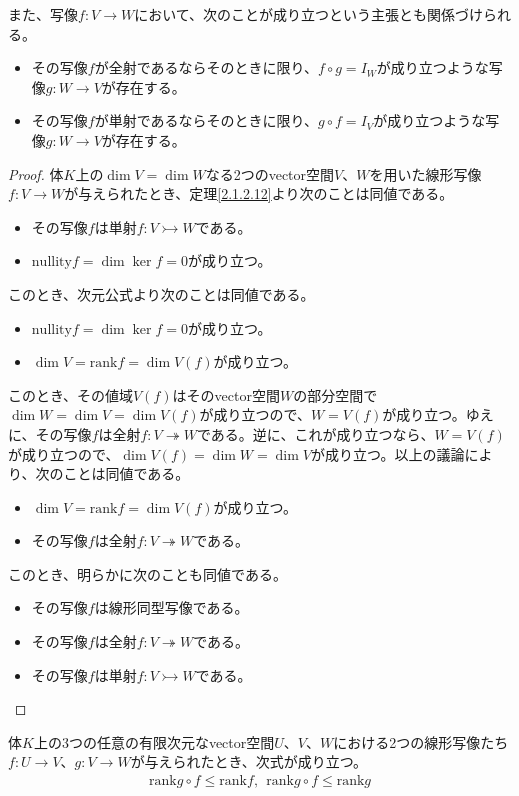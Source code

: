 \documentclass[dvipdfmx]{jsarticle}
\begin{document}
また、写像$f:V \rightarrow W$において、次のことが成り立つという主張とも関係づけられる。
\begin{itemize}
\item
  その写像$f$が全射であるならそのときに限り、$f \circ g = I_{W}$が成り立つような写像$g:W \rightarrow V$が存在する。
\item
  その写像$f$が単射であるならそのときに限り、$g \circ f = I_{V}$が成り立つような写像$g:W \rightarrow V$が存在する。
\end{itemize}
\begin{proof}
体$K$上の$\dim V = \dim W$なる2つのvector空間$V$、$W$を用いた線形写像$f:V \rightarrow W$が与えられたとき、定理\ref{2.1.2.12}より次のことは同値である。
\begin{itemize}
\item
  その写像$f$は単射$f:V \rightarrowtail W$である。
\item
  ${\mathrm{nullity}}f = \dim{\ker f} = 0$が成り立つ。
\end{itemize}
このとき、次元公式より次のことは同値である。
\begin{itemize}
\item
  ${\mathrm{nullity}}f = \dim{\ker f} = 0$が成り立つ。
\item
  $\dim V = {\mathrm{rank}}f = \dim{V(f)}$が成り立つ。
\end{itemize}
このとき、その値域$V(f)$はそのvector空間$W$の部分空間で$\dim W = \dim V = \dim{V(f)}$が成り立つので、$W = V(f)$が成り立つ。ゆえに、その写像$f$は全射$f:V \twoheadrightarrow W$である。逆に、これが成り立つなら、$W = V(f)$が成り立つので、$\dim{V(f)} = \dim W = \dim V$が成り立つ。以上の議論により、次のことは同値である。
\begin{itemize}
\item
  $\dim V = {\mathrm{rank}}f = \dim{V(f)}$が成り立つ。
\item
  その写像$f$は全射$f:V \twoheadrightarrow W$である。
\end{itemize}
このとき、明らかに次のことも同値である。
\begin{itemize}
\item
  その写像$f$は線形同型写像である。
\item
  その写像$f$は全射$f:V \twoheadrightarrow W$である。
\item
  その写像$f$は単射$f:V \rightarrowtail W$である。
\end{itemize}
\end{proof}
\begin{thm}\label{2.1.2.16}
体$K$上の3つの任意の有限次元なvector空間$U$、$V$、$W$における2つの線形写像たち$f:U \rightarrow V$、$g:V \rightarrow W$が与えられたとき、次式が成り立つ。
\begin{align*}
{\mathrm{rank}}{g \circ f} \leq {\mathrm{rank}}f,\ \ {\mathrm{rank}}{g \circ f} \leq {\mathrm{rank}}g
\end{align*}
\end{thm}
\end{document}
